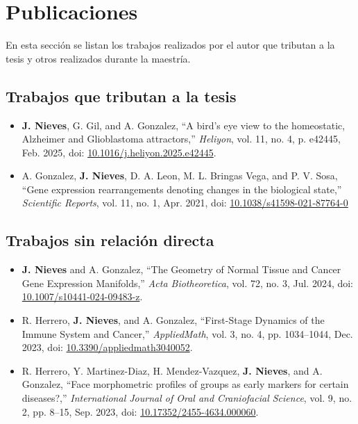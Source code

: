 \section*{Publicaciones}

En esta sección se listan los trabajos realizados por el autor que tributan a la tesis y otros realizados durante la maestría.


\subsection*{Trabajos que tributan a la tesis}

\begin{itemize}
	\item \textbf{J. Nieves}, G. Gil, and A. Gonzalez, ``A bird's eye view to the homeostatic, Alzheimer and Glioblastoma attractors,'' \textit{Heliyon}, vol. 11, no. 4, p. e42445, Feb. 2025, doi: \href{https://doi.org/10.1016/j.heliyon.2025.e42445}{10.1016/j.heliyon.2025.e42445}.
	
	\item A. Gonzalez, \textbf{J. Nieves}, D. A. Leon, M. L. Bringas Vega, and P. V. Sosa, ``Gene expression rearrangements denoting changes in the biological state,'' \textit{Scientific Reports}, vol. 11, no. 1, Apr. 2021, doi: \href{https://doi.org/10.1038/s41598-021-87764-0}{10.1038/s41598-021-87764-0}
\end{itemize}

\subsection*{Trabajos sin relación directa}

\begin{itemize}
	\item \textbf{J. Nieves} and A. Gonzalez, ``The Geometry of Normal Tissue and Cancer Gene Expression Manifolds,'' \textit{Acta Biotheoretica}, vol. 72, no. 3, Jul. 2024, doi: \href{https://doi.org/10.1007/s10441-024-09483-z}{10.1007/s10441-024-09483-z}.
	
	\item R. Herrero, \textbf{J. Nieves}, and A. Gonzalez, ``First-Stage Dynamics of the Immune System and Cancer,'' \textit{AppliedMath}, vol. 3, no. 4, pp. 1034–1044, Dec. 2023, doi: \href{https://doi.org/10.3390/appliedmath3040052}{10.3390/appliedmath3040052}.
	
	\item R. Herrero, Y. Martinez-Diaz, H. Mendez-Vazquez, \textbf{J. Nieves}, and A. Gonzalez, ``Face morphometric profiles of groups as early markers for certain diseases?,'' \textit{International Journal of Oral and Craniofacial Science}, vol. 9, no. 2, pp. 8–15, Sep. 2023, doi: \href{https://doi.org/10.17352/2455-4634.000060}{10.17352/2455-4634.000060}.
\end{itemize}

